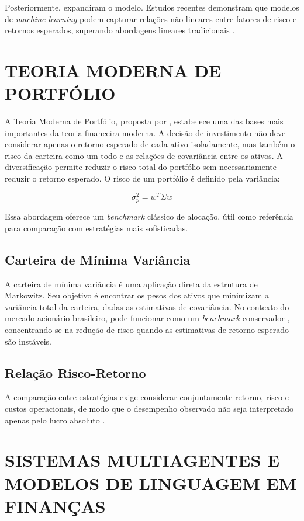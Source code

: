 \documentclass{eic-bcc-tcc}
\begin{document}
Posteriormente, \citep{FamaFrench2015} expandiram o modelo. Estudos recentes demonstram que modelos de \textit{machine learning} podem capturar relações não lineares entre fatores de risco e retornos esperados, superando abordagens lineares tradicionais \citep{Gu2020}.

\section{TEORIA MODERNA DE PORTFÓLIO}

A Teoria Moderna de Portfólio, proposta por \citet{Markowitz1952}, estabelece uma das bases mais importantes da teoria financeira moderna. A decisão de investimento não deve considerar apenas o retorno esperado de cada ativo isoladamente, mas também o risco da carteira como um todo e as relações de covariância entre os ativos. A diversificação permite reduzir o risco total do portfólio sem necessariamente reduzir o retorno esperado. O risco de um portfólio é definido pela variância:

\begin{equation}
\sigma_p^2 = w^T \Sigma w
\end{equation}

Essa abordagem oferece um \textit{benchmark} clássico de alocação, útil como referência para comparação com estratégias mais sofisticadas.

\subsection{Carteira de Mínima Variância}
A carteira de mínima variância é uma aplicação direta da estrutura de Markowitz. Seu objetivo é encontrar os pesos dos ativos que minimizam a variância total da carteira, dadas as estimativas de covariância. No contexto do mercado acionário brasileiro, pode funcionar como um \textit{benchmark} conservador \citep{Clarke2006}, concentrando-se na redução de risco quando as estimativas de retorno esperado são instáveis.

\subsection{Relação Risco-Retorno}
A comparação entre estratégias exige considerar conjuntamente retorno, risco e custos operacionais, de modo que o desempenho observado não seja interpretado apenas pelo lucro absoluto \citep{LopezDePrado2018}.

\section{SISTEMAS MULTIAGENTES E MODELOS DE LINGUAGEM EM FINANÇAS}
\end{document}
